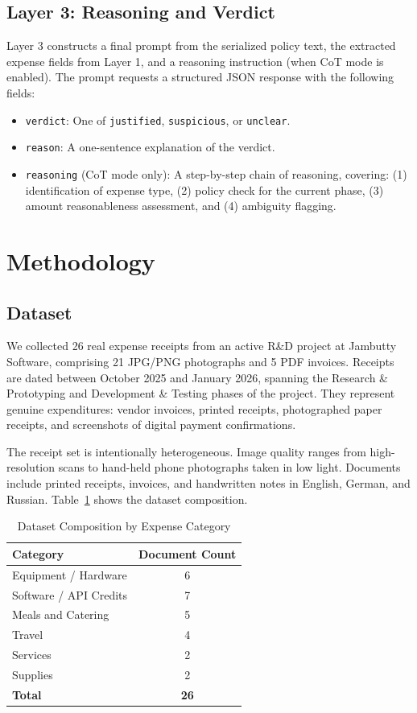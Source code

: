 \documentclass[11pt,a4paper]{article}
\begin{document}
\subsection{Layer 3: Reasoning and Verdict}
Layer 3 constructs a final prompt from the serialized policy text, the extracted expense fields from Layer 1, and a reasoning instruction (when CoT mode is enabled). The prompt requests a structured JSON response with the following fields:
\begin{itemize}
    \item \texttt{verdict}: One of \texttt{justified}, \texttt{suspicious}, or \texttt{unclear}.
    \item \texttt{reason}: A one-sentence explanation of the verdict.
    \item \texttt{reasoning} (CoT mode only): A step-by-step chain of reasoning, covering: (1) identification of expense type, (2) policy check for the current phase, (3) amount reasonableness assessment, and (4) ambiguity flagging.
\end{itemize}

\section{Methodology}

\subsection{Dataset}
We collected 26 real expense receipts from an active R\&D project at Jambutty Software, comprising 21 JPG/PNG photographs and 5 PDF invoices. Receipts are dated between October 2025 and January 2026, spanning the Research \& Prototyping and Development \& Testing phases of the project. They represent genuine expenditures: vendor invoices, printed receipts, photographed paper receipts, and screenshots of digital payment confirmations.

The receipt set is intentionally heterogeneous. Image quality ranges from high-resolution scans to hand-held phone photographs taken in low light. Documents include printed receipts, invoices, and handwritten notes in English, German, and Russian. Table~\ref{tab:dataset} shows the dataset composition.

\begin{table}[htbp]
\centering
\caption{Dataset Composition by Expense Category}
\label{tab:dataset}
\begin{tabular}{lc}
\toprule
\textbf{Category} & \textbf{Document Count} \\
\midrule
Equipment / Hardware & 6 \\
Software / API Credits & 7 \\
Meals and Catering & 5 \\
Travel & 4 \\
Services & 2 \\
Supplies & 2 \\
\midrule
\textbf{Total} & \textbf{26} \\
\bottomrule
\end{tabular}
\end{table}
\end{document}
